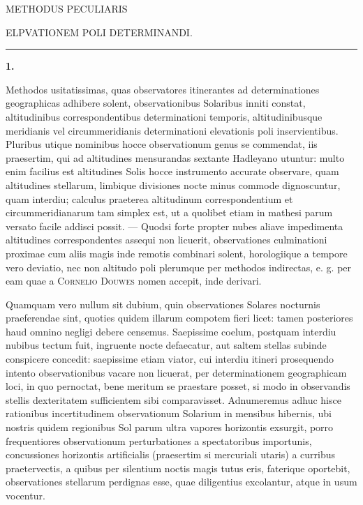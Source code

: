 \renewcommand{\Article}[1]{\par\medskip\Needspace{5\baselineskip}\pdfbookmark[1]{Art. #1}{poli1808-art-#1}\begin{center}\textbf{#1.}\end{center}\nobreak}
\begin{center}\large METHODUS PECULIARIS\par\medskip
ELPVATIONEM POLI DETERMINANDI.\par\medskip\rule{.18\linewidth}{.3pt}\end{center}
\Article{1}
Methodos usitatissimas, quas observatores itinerantes ad determinationes geographicas adhibere solent, observationibus Solaribus inniti constat, altitudinibus correspondentibus determinationi temporis, altitudinibusque meridianis vel circummeridianis determinationi elevationis poli inservientibus. Pluribus utique nominibus hocce observationum genus se commendat, iis praesertim, qui ad altitudines mensurandas sextante Hadleyano utuntur: multo enim facilius est altitudines Solis hocce instrumento accurate observare, quam altitudines stellarum, limbique divisiones nocte minus commode dignoscuntur, quam interdiu; calculus praeterea altitudinum correspondentium et circummeridianarum tam simplex est, ut a quolibet etiam in mathesi parum versato facile addisci possit. --- Quodsi forte propter nubes aliave impedimenta altitudines correspondentes assequi non licuerit, observationes culminationi proximae cum aliis magis inde remotis combinari solent, horologiique a tempore vero deviatio, nec non altitudo poli plerumque per methodos indirectas, e. g. per eam quae a \textsc{Cornelio Douwes} nomen accepit, inde derivari.

Quamquam vero nullum sit dubium, quin observationes Solares nocturnis praeferendae sint, quoties quidem illarum compotem fieri licet: tamen posteriores haud omnino negligi debere censemus. Saepissime coelum, postquam interdiu nubibus tectum fuit, ingruente nocte defaecatur, aut saltem stellas subinde
conspicere concedit: saepissime etiam viator, cui interdiu itineri prosequendo intento observationibus vacare non licuerat, per determinationem geographicam loci, in quo pernoctat, bene meritum se praestare posset, si modo in observandis stellis dexteritatem sufficientem sibi comparavisset. Adnumeremus adhuc hisce rationibus incertitudinem observationum Solarium in mensibus hibernis, ubi nostris quidem regionibus Sol parum ultra vapores horizontis exsurgit, porro frequentiores observationum perturbationes a spectatoribus importunis, concussiones horizontis artificialis (praesertim si mercuriali utaris) a curribus praetervectis, a quibus per silentium noctis magis tutus eris, faterique oportebit, observationes stellarum perdignas esse, quae diligentius excolantur, atque in usum vocentur.


